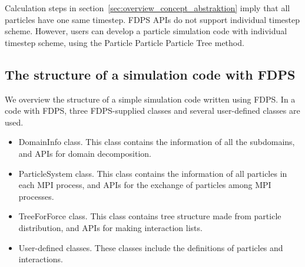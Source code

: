 Calculation steps in section~\ref{sec:overview_concept_abstraktion}
imply that all particles have one same timestep. FDPS APIs do not
support individual timestep scheme. However, users can develop a
particle simulation code with individual timestep scheme, using the
Particle Particle Particle Tree method.

\subsection{The structure of a simulation code with FDPS}
\label{sec:overview_action}

We overview the structure of a simple simulation code written using FDPS.
In a code with FDPS, three FDPS-supplied classes and several user-defined
classes are used.
\begin{itemize}
\item DomainInfo class. This class contains the information of all the
  subdomains, and APIs for domain decomposition.

\item ParticleSystem class. This class contains the information of all
  particles in each MPI process, and APIs for the exchange of
  particles among MPI processes.

\item TreeForForce class. This class contains tree structure made from
  particle distribution, and APIs for making interaction lists.

\item User-defined classes. These classes include the definitions of
  particles and interactions.
\end{itemize}

